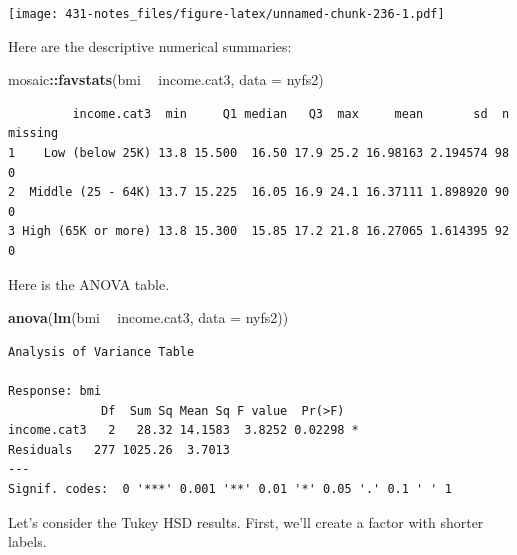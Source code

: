 \documentclass[
]{book}
\newenvironment{Shaded}{\begin{snugshade}}{\end{snugshade}}
\newcommand{\DataTypeTok}[1]{\textcolor[rgb]{0.13,0.29,0.53}{#1}}
\newcommand{\FloatTok}[1]{\textcolor[rgb]{0.00,0.00,0.81}{#1}}
\newcommand{\KeywordTok}[1]{\textcolor[rgb]{0.13,0.29,0.53}{\textbf{#1}}}
\newcommand{\NormalTok}[1]{#1}
\newcommand{\OperatorTok}[1]{\textcolor[rgb]{0.81,0.36,0.00}{\textbf{#1}}}
\newcommand{\StringTok}[1]{\textcolor[rgb]{0.31,0.60,0.02}{#1}}
\begin{document}
\texttt{[image: 431-notes\_files/figure-latex/unnamed-chunk-236-1.pdf]}

Here are the descriptive numerical summaries:

\begin{Shaded}
\begin{Highlighting}[]
\NormalTok{mosaic}\OperatorTok{::}\KeywordTok{favstats}\NormalTok{(bmi }\OperatorTok{~}\StringTok{ }\NormalTok{income.cat3, }\DataTypeTok{data =}\NormalTok{ nyfs2)}
\end{Highlighting}
\end{Shaded}

\begin{verbatim}
         income.cat3  min     Q1 median   Q3  max     mean       sd  n missing
1    Low (below 25K) 13.8 15.500  16.50 17.9 25.2 16.98163 2.194574 98       0
2  Middle (25 - 64K) 13.7 15.225  16.05 16.9 24.1 16.37111 1.898920 90       0
3 High (65K or more) 13.8 15.300  15.85 17.2 21.8 16.27065 1.614395 92       0
\end{verbatim}

Here is the ANOVA table.

\begin{Shaded}
\begin{Highlighting}[]
\KeywordTok{anova}\NormalTok{(}\KeywordTok{lm}\NormalTok{(bmi }\OperatorTok{~}\StringTok{ }\NormalTok{income.cat3, }\DataTypeTok{data =}\NormalTok{ nyfs2))}
\end{Highlighting}
\end{Shaded}

\begin{verbatim}
Analysis of Variance Table

Response: bmi
             Df  Sum Sq Mean Sq F value  Pr(>F)  
income.cat3   2   28.32 14.1583  3.8252 0.02298 *
Residuals   277 1025.26  3.7013                  
---
Signif. codes:  0 '***' 0.001 '**' 0.01 '*' 0.05 '.' 0.1 ' ' 1
\end{verbatim}

Let's consider the Tukey HSD results. First, we'll create a factor with shorter labels.

\begin{Shaded}
\end{Shaded}
\end{document}
